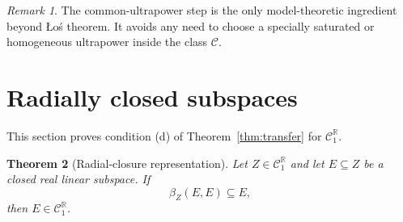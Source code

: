 \documentclass[11pt]{article}
\newcommand{\C}{\mathcal C}
\newcommand{\R}{\mathbb R}
\newcommand{\1}{\mathbf 1}
\newtheorem{theorem}{Theorem}[section]
\theoremstyle{definition}
\theoremstyle{remark}
\newtheorem{remark}[theorem]{Remark}
\begin{document}
\begin{remark}
The common-ultrapower step is the only model-theoretic ingredient beyond
{\L}o\'s theorem.  It avoids any need to choose a specially saturated or
homogeneous ultrapower inside the class $\C$.
\end{remark}

\section{Radially closed subspaces}

This section proves condition (d) of Theorem~\ref{thm:transfer} for
$\C_1^{\R}$.

\begin{theorem}[Radial-closure representation]
\label{thm:radial-closed}
Let $Z\in\C_1^{\R}$ and let $E\subseteq Z$ be a closed real linear subspace.
If
\[
                       \beta_Z(E,E)\subseteq E,
\]
then $E\in\C_1^{\R}$.
\end{theorem}
\end{document}
